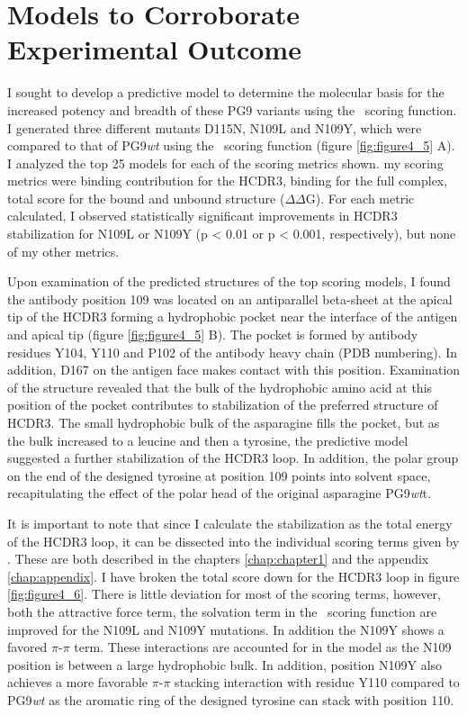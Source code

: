 \section{Models to Corroborate Experimental Outcome}
I sought to develop a predictive model to determine the molecular basis for the increased potency and breadth of these PG9 variants using the \rosetta~scoring function. I generated three different mutants D115N, N109L and N109Y, which were compared to that of PG9\textit{wt} using the \rosetta~scoring function (figure \ref{fig:figure4_5} A). I analyzed the top 25 models for each of the scoring metrics shown. my scoring metrics were binding contribution for the HCDR3, binding for the full complex, total score for the bound and unbound structure ($\Delta\Delta$G). For each metric calculated, I observed statistically significant improvements in HCDR3 stabilization for N109L or N109Y (p < 0.01 or p < 0.001, respectively), but none of my other metrics.

Upon examination of the predicted structures of the top scoring models, I found the antibody position 109 was located on an antiparallel beta-sheet at the apical tip of the HCDR3 forming a hydrophobic pocket near the interface of the antigen and apical tip (figure \ref{fig:figure4_5} B). The pocket is formed by antibody residues Y104, Y110 and P102 of the antibody heavy chain (PDB numbering). In addition, D167 on the antigen face makes contact with this position. Examination of the structure revealed that the bulk of the hydrophobic amino acid at this position of the pocket contributes to stabilization of the preferred structure of HCDR3. The small hydrophobic bulk of the asparagine fills the pocket, but as the bulk increased to a leucine and then a tyrosine, the predictive model suggested a further stabilization of the HCDR3 loop. In addition, the polar group on the end of the designed tyrosine at position 109 points into solvent space, recapitulating the effect of the polar head of the original asparagine PG9\textit{wt}t.

It is important to note that since I calculate the stabilization as the total energy of the HCDR3 loop, it can be dissected into the individual scoring terms given by \rosetta. These are both described in the chapters \ref{chap:chapter1} and the appendix \ref{chap:appendix}. I have broken the total score down for the HCDR3 loop in figure \ref{fig:figure4_6}. There is little deviation for most of the scoring terms, however, both the attractive force term, the solvation term in the \rosetta~scoring function are improved for the N109L and N109Y mutations. In addition the N109Y shows a favored $\pi$-$\pi$ term. These interactions are accounted for in the model as the N109 position is between a large hydrophobic bulk. In addition, position N109Y also achieves a more favorable $\pi$-$\pi$ stacking interaction with residue Y110 compared to PG9\textit{wt} as the aromatic ring of the designed tyrosine can stack with position 110.

